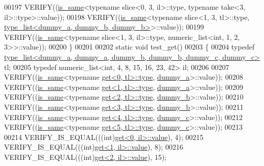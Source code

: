 \begin{DoxyCode}
00197   VERIFY((\hyperlink{struct_eigen_1_1internal_1_1is__same}{is\_same}<\textcolor{keyword}{typename} slice<0, 3, il>::type, \textcolor{keyword}{typename} take<3, il>::type>::value));
00198   VERIFY((\hyperlink{struct_eigen_1_1internal_1_1is__same}{is\_same}<\textcolor{keyword}{typename} slice<1, 3, tl>::type, 
      \hyperlink{struct_eigen_1_1internal_1_1type__list}{type\_list<dummy\_a, dummy\_b, dummy\_b>}>::value));
00199   VERIFY((\hyperlink{struct_eigen_1_1internal_1_1is__same}{is\_same}<\textcolor{keyword}{typename} slice<1, 3, il>::type, numeric\_list<int, 1, 2, 3>>::value));
00200 \}
00201 
00202 \textcolor{keyword}{static} \textcolor{keywordtype}{void} test\_get()
00203 \{
00204   \textcolor{keyword}{typedef} \hyperlink{struct_eigen_1_1internal_1_1type__list}{type\_list<dummy\_a, dummy\_a, dummy\_b, dummy\_b, dummy\_c, dummy\_c>}
       tl;
00205   \textcolor{keyword}{typedef} numeric\_list<int, 4, 8, 15, 16, 23, 42> il;
00206 
00207   VERIFY((\hyperlink{struct_eigen_1_1internal_1_1is__same}{is\_same}<\textcolor{keyword}{typename} \hyperlink{struct_eigen_1_1internal_1_1get}{get<0, tl>::type}, \hyperlink{structdummy__a}{dummy\_a}>::value));
00208   VERIFY((\hyperlink{struct_eigen_1_1internal_1_1is__same}{is\_same}<\textcolor{keyword}{typename} \hyperlink{struct_eigen_1_1internal_1_1get}{get<1, tl>::type}, \hyperlink{structdummy__a}{dummy\_a}>::value));
00209   VERIFY((\hyperlink{struct_eigen_1_1internal_1_1is__same}{is\_same}<\textcolor{keyword}{typename} \hyperlink{struct_eigen_1_1internal_1_1get}{get<2, tl>::type}, \hyperlink{structdummy__b}{dummy\_b}>::value));
00210   VERIFY((\hyperlink{struct_eigen_1_1internal_1_1is__same}{is\_same}<\textcolor{keyword}{typename} \hyperlink{struct_eigen_1_1internal_1_1get}{get<3, tl>::type}, \hyperlink{structdummy__b}{dummy\_b}>::value));
00211   VERIFY((\hyperlink{struct_eigen_1_1internal_1_1is__same}{is\_same}<\textcolor{keyword}{typename} \hyperlink{struct_eigen_1_1internal_1_1get}{get<4, tl>::type}, \hyperlink{structdummy__c}{dummy\_c}>::value));
00212   VERIFY((\hyperlink{struct_eigen_1_1internal_1_1is__same}{is\_same}<\textcolor{keyword}{typename} \hyperlink{struct_eigen_1_1internal_1_1get}{get<5, tl>::type}, \hyperlink{structdummy__c}{dummy\_c}>::value));
00213 
00214   VERIFY\_IS\_EQUAL(((\textcolor{keywordtype}{int})\hyperlink{struct_eigen_1_1internal_1_1get}{get<0, il>::value}), 4);
00215   VERIFY\_IS\_EQUAL(((\textcolor{keywordtype}{int})\hyperlink{struct_eigen_1_1internal_1_1get}{get<1, il>::value}), 8);
00216   VERIFY\_IS\_EQUAL(((\textcolor{keywordtype}{int})\hyperlink{struct_eigen_1_1internal_1_1get}{get<2, il>::value}), 15);

\end{DoxyCode}
